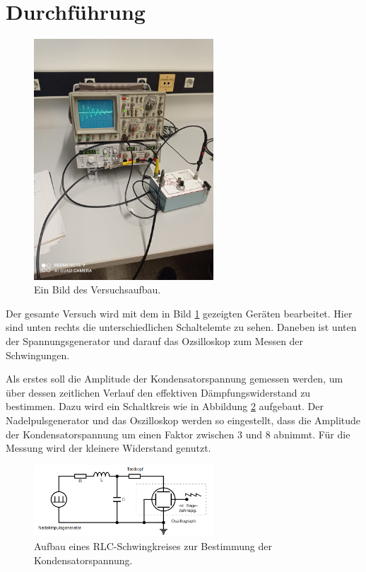 \section{Durchführung}

\begin{figure}[H]
    \centering
    \includegraphics[width=0.6\textwidth]{images/Aufbau.jpeg}
    \caption{Ein Bild des Versuchsaufbau.}
    \label{img:aufb}
\end{figure}

\noindent Der gesamte Versuch wird mit dem in Bild \ref{img:aufb} gezeigten Geräten bearbeitet. Hier sind unten rechts die unterschiedlichen 
Schaltelemte zu sehen. Daneben ist unten der Spannungsgenerator und darauf das Ozsilloskop zum Messen der Schwingungen.

\noindent Als erstes soll die Amplitude der Kondensatorspannung gemessen werden, um über dessen zeitlichen Verlauf den effektiven Dämpfungswiderstand 
zu bestimmen. Dazu wird ein Schaltkreis wie in Abbildung \ref{img:5a} aufgebaut. Der Nadelpulsgenerator und das Oszilloskop werden so eingestellt, dass die 
Amplitude der Kondensatorspannung um einen Faktor zwischen 3 und 8 abnimmt. Für die Messung wird der kleinere Widerstand genutzt.

\begin{figure}[H]
    \centering
    \includegraphics[width=0.6\textwidth]{images/5a.PNG}
    \caption{Aufbau eines RLC-Schwingkreises zur Bestimmung der Kondensatorspannung.}
    \label{img:5a}
\end{figure}

